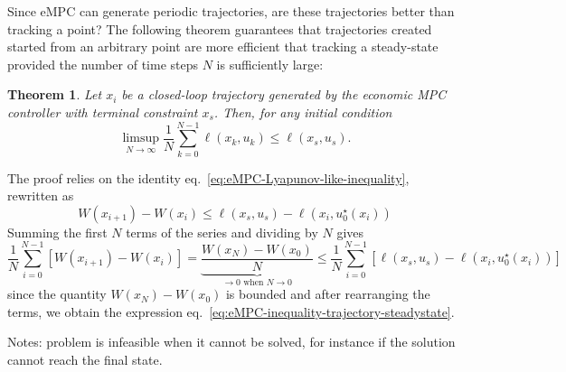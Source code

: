 \documentclass[11pt]{report}
\newtheorem{theorem}{Theorem}
\begin{document}
Since eMPC can generate periodic trajectories, are these trajectories better than tracking a point? The following theorem guarantees that trajectories created started from an arbitrary point are more efficient that tracking a steady-state provided the number of time steps $N$ is sufficiently large:
\begin{theorem}
  Let $x_i$ be a closed-loop trajectory generated by the economic MPC controller with terminal constraint $x_s$. Then, for any initial condition
  \begin{equation}
    \label{eq:eMPC-inequality-trajectory-steadystate}
    \limsup_{N\rightarrow \infty} \frac{1}{N} \sum_{k=0}^{N-1} \ell(x_k,u_k) \le \ell(x_s,u_s).
  \end{equation}
\end{theorem}
The proof relies on the identity eq.~\eqref{eq:eMPC-Lyapunov-like-inequality}, rewritten as
\begin{equation*}
  W(x_{i+1}) - W(x_i) \le \ell(x_s,u_s) - \ell(x_i,u_0^\star(x_i))
\end{equation*}
Summing the first $N$ terms of the series and dividing by $N$ gives
\begin{equation*}
  \frac{1}{N}\sum_{i=0}^{N-1} \left[W(x_{i+1}) - W(x_i)\right] = \underbrace{\frac{W(x_N) - W(x_0)}{N}}_{\rightarrow 0 \text{ when } N\rightarrow 0} \le \frac{1}{N}\sum_{i=0}^{N-1}  \left[\ell(x_s,u_s) - \ell(x_i,u_0^\star(x_i))\right]
\end{equation*}
since the quantity $W(x_N) - W(x_0)$ is bounded and after rearranging the terms, we obtain the expression eq.~\eqref{eq:eMPC-inequality-trajectory-steadystate}.

Notes: problem is infeasible when it cannot be solved, for instance if the solution cannot reach the final state.
\end{document}
